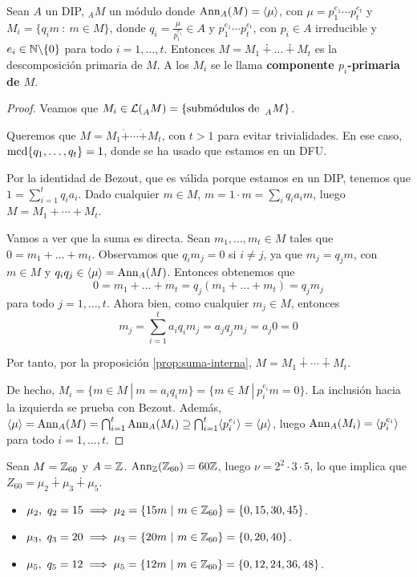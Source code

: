 \begin{prop}
  Sean \(A\) un DIP, \({}_AM\) un módulo donde \(\operatorname{Ann}_A(M) = \langle\mu\rangle\), con
  \(\mu = p_1^{e_1}\cdots p_t^{e_t}\) y \(M_i = \{q_im \ : \ m \in M\}\), donde
  \(q_i = \frac{\mu}{p_i^{e_i}} \in A\) y \(p_1^{e_1}\cdots p_t^{e_t}\), con \(p_i\in A\)
  irreducible y \(e_i \in \mathbb{N}\backslash\{0\}\) para todo \(i = 1, \ldots, t\).
  Entonces
  \(M = M_1 \dotplus \ldots \dotplus M_t\) es la descomposición primaria de \(M\). A los
  \(M_i\) se le llama \textbf{componente \(p_i\)-primaria de \(M\)}.
\end{prop}
\begin{proof}
  Veamos que \(M_i\in\mathcal{L}(\prescript{}{A}{M})=\{\textrm{submódulos
    de } \prescript{}{A}{M}\}\).

  Queremos que \(M=M_1\dot{+}\cdots \dot{+}M_t\), con \(t>1\) para
  evitar trivialidades. En ese caso, \(\operatorname{mcd}\{q_1,\ldots,q_t\} = 1\),
  donde se ha usado que estamos en un DFU.

  Por la identidad de Bezout, que es válida porque estamos en un DIP,
  tenemos que \(1=\sum_{i=1}^t q_i a_i\). Dado cualquier \(m \in M\),
  \(m = 1 \cdot m = \sum_i q_i a_i m\), luego \(M = M_1+ \cdots + M_t\).

  Vamos a ver que la suma es directa.
  Sean \(m_1, \ldots, m_t \in M\) tales que \(0 = m_1 + \ldots + m_t\). Observamos que
  \(q_im_j = 0\) si \(i \neq j\), ya que \(m_j = q_jm\), con \(m \in M\) y
  \(q_iq_j \in \langle \mu \rangle = \operatorname{Ann}_A(M)\). Entonces obtenemos que
  \[
    0 = m_1 + \ldots + m_t = q_j(m_1 + \ldots + m_t) = q_jm_j
  \]
  para todo \(j = 1, \ldots, t\). Ahora bien, como cualquier \(m_j \in M\), entonces
  \[
    m_j = \sum_{i=1}^{t}a_iq_im_j = a_jq_jm_j = a_j0 = 0
  \]
  
  Por tanto, por la proposición \ref{prop:suma-interna}, \(M=M_1\dotplus \cdots \dotplus
  M_t\).

  De hecho, \(M_i = \{m \in M \ | \ m = a_iq_im\} = \{m \in M \ | \ p_i^{e_i}m = 0\}\). La
  inclusión hacia la izquierda se prueba con Bezout.
  Además, \(\langle \mu \rangle = \operatorname{Ann}_A(M) = \bigcap_{i=1}^{t}\operatorname{Ann}_A(M_i)
  \supseteq \bigcap_{i=1}^{t} \langle p_i^{e_i}\rangle = \langle \mu \rangle\),
  luego \(\operatorname{Ann}_A(M_i) = \langle p_i^{e_i} \rangle\) para todo \(i=1, \ldots, t\).
\end{proof}

\begin{ejemplo}
  Sean \( M = \mathbb{Z}_{60}\) y \(A = \mathbb{Z}\). \(\operatorname{Ann}_{\mathbb{Z}}(\mathbb{Z}_{60}) = 60\mathbb{Z}\), luego \(\nu = 2^2 \cdot 3 \cdot 5\),
lo que implica que \(Z_{60} = \mu_2 \dotplus \mu_3 \dotplus \mu_5\).
\begin{itemize}
  \item \(\mu_2, \ q_2 = 15 \implies \mu_2 = \{15m \ | \ m \in \mathbb{Z}_{60}\} = \{0, 15, 30, 45\}\).
  \item \(\mu_3, \ q_3 = 20 \implies \mu_3 = \{20m \ | \ m \in \mathbb{Z}_{60}\} = \{0, 20, 40\}\).
  \item \(\mu_5, \ q_5 = 12 \implies \mu_5 = \{12m \ | \ m \in \mathbb{Z}_{60}\} = \{0, 12, 24, 36,
    48\}\).
\end{itemize}
\end{ejemplo}

